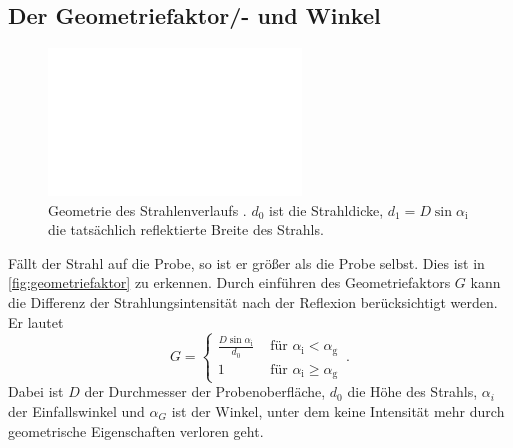 \subsection{Der Geometriefaktor/- und Winkel}
\begin{figure}
    \centering
    \includegraphics[width=0.6\textwidth]{pictures/geometriefaktor.pdf}
    \caption{Geometrie des Strahlenverlaufs \cite{v44}.
            $d_0$ ist die Strahldicke, $d_1 = D \sin \alpha_{\mathrm{i}}$ die tatsächlich reflektierte Breite des Strahls.} 
    \label{fig:geometriefaktor}
\end{figure}
Fällt der Strahl auf die Probe, so ist er größer als die Probe selbst.
Dies ist in \autoref{fig:geometriefaktor} zu erkennen.
Durch einführen des Geometriefaktors $G$ kann die Differenz der Strahlungsintensität nach der Reflexion berücksichtigt werden. 
Er lautet
\begin{equation} \label{eq:geometriefaktor}
    G= \begin{cases}\frac{D \sin \alpha_{\mathrm{i}}}{d_0} & \text { für } \alpha_{\mathrm{i}}<\alpha_{\mathrm{g}} \\ 1 & \text { für } \alpha_{\mathrm{i}} \geq \alpha_{\mathrm{g}}\end{cases} \, .
\end{equation}
Dabei ist $D$ der Durchmesser der Probenoberfläche, $d_0$ die Höhe des Strahls, $\alpha_i$ der Einfallswinkel und $\alpha_G$ ist der Winkel, unter dem keine Intensität mehr
durch geometrische Eigenschaften verloren geht.
